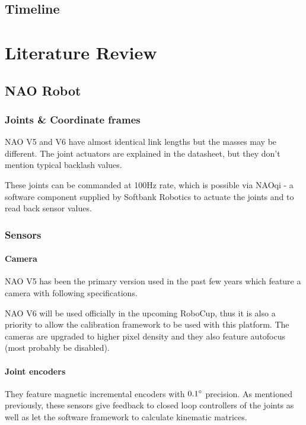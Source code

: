\documentclass[english, printversion, nomenclature, notitle]{tuvisionthesis} %
\begin{document}
\section{Timeline}

\chapter{Literature Review}

\section{NAO Robot}

\subsection{Joints \& Coordinate frames}
NAO V5 and V6 have almost identical link lengths but the masses may be different. The joint actuators are explained in the datasheet, but they don't mention typical backlash values. 

These joints can be commanded at 100Hz rate, which is possible via NAOqi - a software component supplied by Softbank Robotics to actuate the joints and to read back sensor values.

\subsection{Sensors}
\subsubsection{Camera}
NAO V5 has been the primary version used in the past few years which feature a camera with following specifications.

NAO V6 will be used officially in the upcoming RoboCup, thus it is also a priority to allow the calibration framework to be used with this platform. The cameras are upgraded to higher pixel density and they also feature autofocus (most probably be disabled).

\subsubsection{Joint encoders}
\label{subsub:jointEncoders}

They feature magnetic incremental encoders with $0.1\degree$ precision. As mentioned previously, these sensors give feedback to closed loop controllers of the joints as well as let the software framework to calculate kinematic matrices. 
\end{document}
